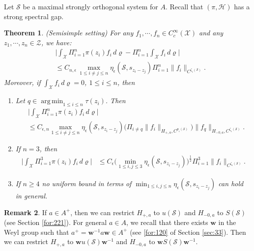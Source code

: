 \documentclass[11 pt]{amsart}
\newcommand{\norm}[1]{\lVert#1\rVert}
\newtheorem{theorem}{Theorem}[section]
\theoremstyle{definition}
\newtheorem{remark}[theorem]{Remark}
\numberwithin{equation}{section}
\begin{document}
Let $\mathcal S$ be a maximal strongly orthogonal system for $A$. Recall that $(\pi, \mathcal{H})$ has a strong spectral gap.







\begin{theorem}\label{th:8}  \emph{(Semisimple setting)}
 For any $f_1,\cdots, f_n\in C_c^{\infty}(\mathcal{X})$ and any $z_1,\cdots,z_n\in\mathcal{Z}$, we have:
 \begin{align*}
 &\Big|\int_{\mathcal{X}} \Pi_{i=1}^{n} \pi(z_i)f_i \,d\varrho - \Pi_{i=1}^{n} \int_{\mathcal{X}} f_i \,d\varrho\Big|\\
 &\leq C_{n,\epsilon}\,\max_{1\le i\neq j\le n} \eta_\epsilon(\mathcal{S}, s_{z_i-z_j})\Pi_{i=1}^{n}\norm{f_{i}}_{C^{\zeta_{\epsilon}(\mathcal{S})}}.
\end{align*}
 Moreover, if   $\int_{\mathcal{X}} f_i \, d\varrho=0$, $1\leq i\leq n$, then
  \begin{enumerate}
     \item\label{for:207} Let $q\in \operatorname*{arg\,min}_{1\le i\le n} \tau(z_i)$.  Then
  \begin{align*}
   &\Big|\int_{\mathcal{X}} \Pi_{i=1}^{n} \pi(z_i)f_i \,d\varrho \Big|\\
   &\le  C_{\epsilon,n}\max_{1\le i\neq j\le n} \eta_\epsilon(\mathcal{S}, s_{z_i-z_j}) \big(\Pi_{i\neq q}\norm{f_i}_{H_{+,a}, C^{p_{\epsilon}(\mathcal{S})}}\big)\norm{f_q}_{H_{-0,a}, C^{\zeta_{\epsilon}(\mathcal{S})}}.
  \end{align*}
     \item \label{for:208} If $n=3$, then
      \begin{align*}
   \Big|\int_{\mathcal{X}} \Pi_{i=1}^{3}\pi(z_i)f_i \, d\varrho\Big|&\leq C_\epsilon \big(\min_{1\le i,j\le 3} \eta_\epsilon(\mathcal{S}, s_{z_i-z_j})\big)^{\frac{1}{2}}\Pi_{i=1}^3\|f_i\|_{C^{\zeta_{\epsilon}(\mathcal{S})}}.
  \end{align*}


\item\label{for:203} If $n\geq 4$ no uniform bound in terms of $\min_{1\le i,j\le n} \eta_\epsilon(\mathcal{S}, s_{z_i-z_j})$ can hold in general.


  \end{enumerate}


\end{theorem}
\begin{remark} If $a\in A^+$, then we can restrict  $H_{+,a}$ to $u(\mathcal{S})$ and $H_{-0,a}$ to $S(\mathcal{S})$  (see  Section \ref{for:221}). For general $a\in A$,  we recall that there exists $\textbf{w}$ in the Weyl group such that $a^+=\textbf{w}^{-1}a\textbf{w}\in A^+$ (see \eqref{for:120} of Section \ref{sec:33}). Then we can restrict $H_{+,a}$ to $\textbf{w}u(\mathcal{S})\textbf{w}^{-1}$ and $H_{-0,a}$ to $\textbf{w}S(\mathcal{S})\textbf{w}^{-1}$.
\end{remark}
\end{document}
